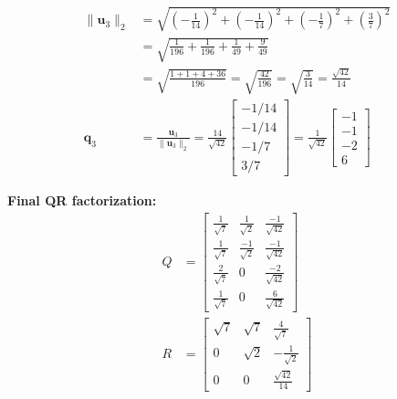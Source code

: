 \begin{align*}
    \|\mathbf{u}_3\|_2 & = \sqrt{\left(-\frac{1}{14}\right)^2 + \left(-\frac{1}{14}\right)^2 + \left(-\frac{1}{7}\right)^2 + \left(\frac{3}{7}\right)^2}                                                                      \\
                       & = \sqrt{\frac{1}{196} + \frac{1}{196} + \frac{1}{49} + \frac{9}{49}}                                                                                                                                 \\
                       & = \sqrt{\frac{1 + 1 + 4 + 36}{196}} = \sqrt{\frac{42}{196}} = \sqrt{\frac{3}{14}} = \frac{\sqrt{42}}{14}                                                                                             \\
    \mathbf{q}_3       & = \frac{\mathbf{u}_3}{\|\mathbf{u}_3\|_2} = \frac{14}{\sqrt{42}} \begin{bmatrix} -1/14 \\ -1/14 \\ -1/7 \\ 3/7 \end{bmatrix} = \frac{1}{\sqrt{42}} \begin{bmatrix} -1 \\ -1 \\ -2 \\ 6 \end{bmatrix}
\end{align*}

\textbf{Final QR factorization:}
\begin{align*}
    Q & = \begin{bmatrix}
              \frac{1}{\sqrt{7}} & \frac{1}{\sqrt{2}}  & \frac{-1}{\sqrt{42}} \\
              \frac{1}{\sqrt{7}} & \frac{-1}{\sqrt{2}} & \frac{-1}{\sqrt{42}} \\
              \frac{2}{\sqrt{7}} & 0                   & \frac{-2}{\sqrt{42}} \\
              \frac{1}{\sqrt{7}} & 0                   & \frac{6}{\sqrt{42}}
          \end{bmatrix} \\
    R & = \begin{bmatrix}
              \sqrt{7} & \sqrt{7} & \frac{4}{\sqrt{7}}   \\
              0        & \sqrt{2} & -\frac{1}{\sqrt{2}}  \\
              0        & 0        & \frac{\sqrt{42}}{14}
          \end{bmatrix}
\end{align*}

